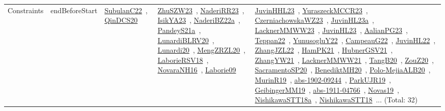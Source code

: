 {\begin{longtable}{lp{3cm}>{\raggedright\arraybackslash}p{6cm}>{\raggedright\arraybackslash}p{6cm}>{\raggedright\arraybackslash}p{8cm}}
Constraints & endBeforeStart & \href{works/SubulanC22.pdf}{SubulanC22}~\cite{SubulanC22}, \href{works/QinDCS20.pdf}{QinDCS20}~\cite{QinDCS20} & \href{works/ZhuSZW23.pdf}{ZhuSZW23}~\cite{ZhuSZW23}, \href{works/NaderiRR23.pdf}{NaderiRR23}~\cite{NaderiRR23}, \href{works/IsikYA23.pdf}{IsikYA23}~\cite{IsikYA23}, \href{works/NaderiBZ22a.pdf}{NaderiBZ22a}~\cite{NaderiBZ22a}, \href{works/PandeyS21a.pdf}{PandeyS21a}~\cite{PandeyS21a}, \href{works/LunardiBLRV20.pdf}{LunardiBLRV20}~\cite{LunardiBLRV20}, \href{works/Lunardi20.pdf}{Lunardi20}~\cite{Lunardi20}, \href{works/MengZRZL20.pdf}{MengZRZL20}~\cite{MengZRZL20}, \href{works/LaborieRSV18.pdf}{LaborieRSV18}~\cite{LaborieRSV18}, \href{works/NovaraNH16.pdf}{NovaraNH16}~\cite{NovaraNH16}, \href{works/Laborie09.pdf}{Laborie09}~\cite{Laborie09} & \href{works/JuvinHHL23.pdf}{JuvinHHL23}~\cite{JuvinHHL23}, \href{works/YuraszeckMCCR23.pdf}{YuraszeckMCCR23}~\cite{YuraszeckMCCR23}, \href{works/CzerniachowskaWZ23.pdf}{CzerniachowskaWZ23}~\cite{CzerniachowskaWZ23}, \href{works/JuvinHL23a.pdf}{JuvinHL23a}~\cite{JuvinHL23a}, \href{works/LacknerMMWW23.pdf}{LacknerMMWW23}~\cite{LacknerMMWW23}, \href{works/JuvinHL23.pdf}{JuvinHL23}~\cite{JuvinHL23}, \href{works/AalianPG23.pdf}{AalianPG23}~\cite{AalianPG23}, \href{works/Teppan22.pdf}{Teppan22}~\cite{Teppan22}, \href{works/YunusogluY22.pdf}{YunusogluY22}~\cite{YunusogluY22}, \href{works/CampeauG22.pdf}{CampeauG22}~\cite{CampeauG22}, \href{works/JuvinHL22.pdf}{JuvinHL22}~\cite{JuvinHL22}, \href{works/ZhangJZL22.pdf}{ZhangJZL22}~\cite{ZhangJZL22}, \href{works/HamPK21.pdf}{HamPK21}~\cite{HamPK21}, \href{works/HubnerGSV21.pdf}{HubnerGSV21}~\cite{HubnerGSV21}, \href{works/ZhangYW21.pdf}{ZhangYW21}~\cite{ZhangYW21}, \href{works/LacknerMMWW21.pdf}{LacknerMMWW21}~\cite{LacknerMMWW21}, \href{works/TangB20.pdf}{TangB20}~\cite{TangB20}, \href{works/ZouZ20.pdf}{ZouZ20}~\cite{ZouZ20}, \href{works/SacramentoSP20.pdf}{SacramentoSP20}~\cite{SacramentoSP20}, \href{works/BenediktMH20.pdf}{BenediktMH20}~\cite{BenediktMH20}, \href{works/Polo-MejiaALB20.pdf}{Polo-MejiaALB20}~\cite{Polo-MejiaALB20}, \href{works/MurinR19.pdf}{MurinR19}~\cite{MurinR19}, \href{works/abs-1902-09244.pdf}{abs-1902-09244}~\cite{abs-1902-09244}, \href{works/ParkUJR19.pdf}{ParkUJR19}~\cite{ParkUJR19}, \href{works/GeibingerMM19.pdf}{GeibingerMM19}~\cite{GeibingerMM19}, \href{works/abs-1911-04766.pdf}{abs-1911-04766}~\cite{abs-1911-04766}, \href{works/Novas19.pdf}{Novas19}~\cite{Novas19}, \href{works/NishikawaSTT18a.pdf}{NishikawaSTT18a}~\cite{NishikawaSTT18a}, \href{works/NishikawaSTT18.pdf}{NishikawaSTT18}~\cite{NishikawaSTT18}... (Total: 32)\\

\end{longtable}}

